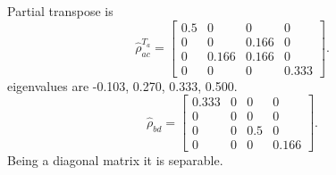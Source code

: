\documentclass{amsart}
\theoremstyle{plain}
\theoremstyle{definition}
\theoremstyle{plain}
\begin{document}
Partial transpose  is
\begin{equation*}
	\hat{\rho}_{ac}^{T_a} = \left[\begin{matrix}0.5 & 0 & 0 & 0\\0 & 0 & 0.166 & 0\\0 & 0.166 & 0.166 & 0\\0 & 0 & 0 & 0.333\end{matrix}\right].
\end{equation*}
eigenvalues are -0.103, 0.270, 0.333, 0.500.
\begin{equation*}
	\hat{\rho}_{bd} = \left[\begin{matrix}0.333 & 0 & 0 & 0\\0 & 0 & 0 & 0\\0 & 0 & 0.5 & 0\\0 & 0 & 0 & 0.166\end{matrix}\right]
	.
\end{equation*}
Being a diagonal matrix it is separable.
\end{document}
